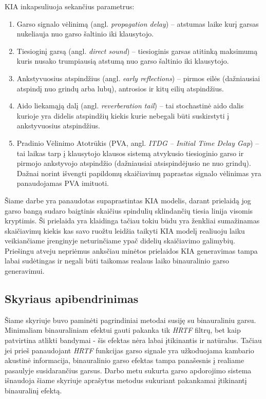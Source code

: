 \documentclass[]{vgtuef}
\begin{document}
KIA inkapsuliuoja sekančius parametrus:
\begin{enumerate}
\item Garso signalo vėlinimą (angl. \textit{propagation delay}) – atstumas laike kurį garsas nukeliauja nuo garso šaltinio iki klausytojo.
\item Tiesioginį garsą (angl. \textit{direct sound}) – tiesioginis garsas atitinką maksimumą kuris nusako trumpiausią atstumą nuo garso šaltinio iki klausytojo.
\item Ankstyvuosius atspindžius (angl. \textit{early reflections}) – pirmos eilės (dažniausiai atspindį nuo grindų arba lubų), antrosios ir kitų eilių atspindžius.\item Aido liekamąją dalį (angl. \textit{reverberation tail}) – tai stochastinė aido dalis kurioje yra didelis atspindžių kiekis kurie nebegali būti suskirstyti į ankstyvuosius atspindžius.  
\item Pradinio Vėlinimo Atotrūkis (PVA, angl. \textit{ITDG – Initial Time Delay Gap}) – tai laikas tarp į klausytojo klausos sistemą atvykusio tiesioginio garso ir pirmojo ankstyvojo atspindžio (dažniausiai atsispindėjusio ne nuo grindų). Dažnai norint išvengti papildomų skaičiavimų paprastas signalo vėlinimas yra panaudojamas PVA imituoti.
\end{enumerate}

Šiame darbe yra panaudotas supaprastintas KIA modelis, darant prielaidą jog garso bangą sudaro baigtinis skaičius spindulių sklindančių tiesia linija visomis kryptimis. Ši prielaida yra klaidinga tačiau tokiu būdu yra ženkliai sumažinamas skaičiavimų kiekis kas savo ruožtu leidžia taikyti KIA modelį realiuoju laiku veikiančiame įrenginyje neturinčiame ypač didelių skaičiavimo galimybių. Priešingu atveju nepriėmus anksčiau minėtos prielaidos KIA generavimas tampa labai sudėtingas ir negali būti taikomas realaus laiko binauralinio garso generavimui.


\subsection{Skyriaus apibendrinimas}

Šiame skyriuje buvo paminėti pagrindiniai metodai susiję su binauraliniu garsu. Minimaliam binauraliniam efektui gauti pakanka tik \textit{HRTF} filtrų, bet kaip patvirtina atlikti bandymai - šis efektas nėra labai įtikinantis ir natūralus. Tačiau jei prieš panaudojant \textit{HRTF} funkcijas garso signale yra užkoduojama kambario akustinė informacija, binauralinio garso efektas tampa panašesnis į realiame pasaulyje susidarančius garsus. 
Darbo metu sukurta garso apdorojimo sistema išnaudoja šiame skyriuje aprašytus metodus sukuriant pakankamai įtikinantį binauralinį efektą.
\end{document}
